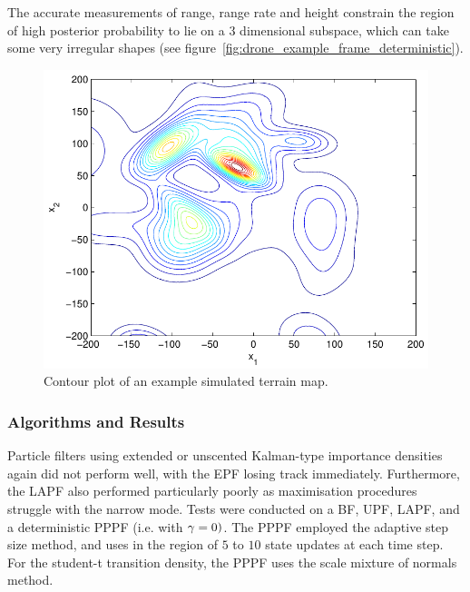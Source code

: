 \documentclass{article}
\begin{document}
The accurate measurements of range, range rate and height constrain the region of high posterior probability to lie on a $3$ dimensional subspace, which can take some very irregular shapes (see figure~\ref{fig:drone_example_frame_deterministic}).
%
\begin{figure}
\centering
\includegraphics[width=0.7\columnwidth]{drone_terrain_map.pdf}
\caption{Contour plot of an example simulated terrain map.}
\label{fig:drone_terrain_map}
\end{figure}

\subsubsection{Algorithms and Results}

Particle filters using extended or unscented Kalman-type importance densities again did not perform well, with the EPF losing track immediately. Furthermore, the LAPF also performed particularly poorly as maximisation procedures struggle with the narrow mode. Tests were conducted on a BF, UPF, LAPF, and a deterministic PPPF (i.e. with $\gamma=0)$. The PPPF employed the adaptive step size method, and uses in the region of $5$ to $10$ state updates at each time step. For the student-t transition density, the PPPF uses the scale mixture of normals method.
\end{document}
